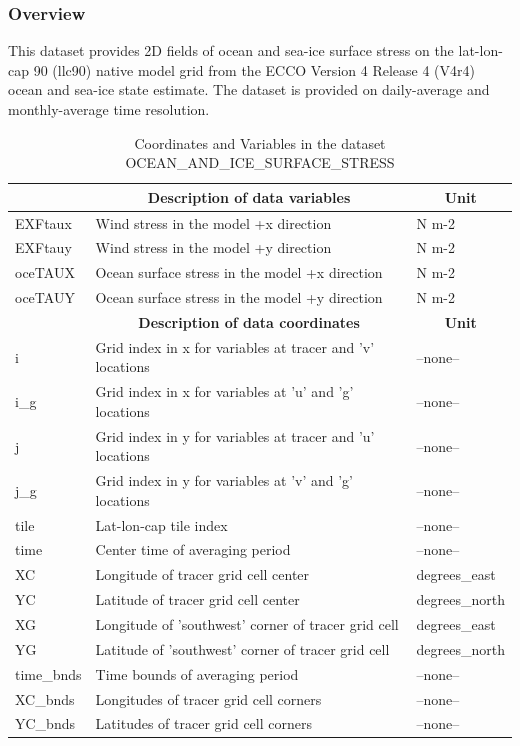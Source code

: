 \subsubsection{Overview}
This dataset provides 2D fields of ocean and sea-ice surface stress on the lat-lon-cap 90 (llc90) native model grid from the ECCO Version 4 Release 4 (V4r4) ocean and sea-ice state estimate. The dataset is provided on daily-average and monthly-average time resolution. 
\begin{longtable}{|m{}|m{}|m{}|}
\caption{Coordinates and Variables in the dataset OCEAN\_AND\_ICE\_SURFACE\_STRESS}
\label{tab:table-OCEAN_AND_ICE_SURFACE_STRESS-fields} \\ 
\hline \endhead \hline \endfoot
\rowcolor{lightgray} \multicolumn{1}{|c|}{\textbf{Variables}} & \multicolumn{1}{|c|}{\textbf{Description of data variables}} &  \multicolumn{1}{|c|}{\textbf{Unit}}\\ \hline
EXFtaux &Wind stress in the model +x direction &N m-2  \\ \hline
EXFtauy &Wind stress in the model +y direction &N m-2  \\ \hline
oceTAUX &Ocean surface stress in the model +x direction &N m-2  \\ \hline
oceTAUY &Ocean surface stress in the model +y direction &N m-2  \\ \hline
\rowcolor{lightgray} \multicolumn{1}{|c|}{\textbf{Coordinates}} & \multicolumn{1}{|c|}{\textbf{Description of data coordinates}} &  \multicolumn{1}{|c|}{\textbf{Unit}}\\ \hline
i &Grid index in x for variables at tracer and 'v' locations &--none--  \\ \hline
i\_g &Grid index in x for variables at 'u' and 'g' locations &--none--  \\ \hline
j &Grid index in y for variables at tracer and 'u' locations &--none--  \\ \hline
j\_g &Grid index in y for variables at 'v' and 'g' locations &--none--  \\ \hline
tile &Lat-lon-cap tile index &--none--  \\ \hline
time &Center time of averaging period &--none--  \\ \hline
XC &Longitude of tracer grid cell center &degrees\_east  \\ \hline
YC &Latitude of tracer grid cell center &degrees\_north  \\ \hline
XG &Longitude of 'southwest' corner of tracer grid cell &degrees\_east  \\ \hline
YG &Latitude of 'southwest' corner of tracer grid cell &degrees\_north  \\ \hline
time\_bnds &Time bounds of averaging period &--none--  \\ \hline
XC\_bnds &Longitudes of tracer grid cell corners &--none--  \\ \hline
YC\_bnds &Latitudes of tracer grid cell corners &--none--  \\ \hline
\end{longtable}

